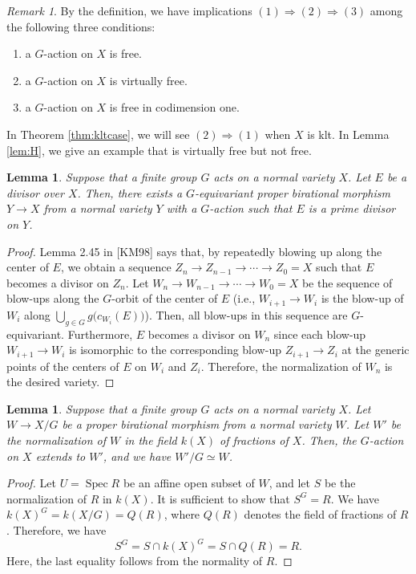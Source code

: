 \documentclass[a4paper,11pt]{amsart}
\newtheorem{lem}[thm]{Lemma}
\theoremstyle{definition}
\theoremstyle{remark}
\newtheorem{rmk}[thm]{Remark}
\begin{document}
\begin{rmk}\label{rmk:between}
By the definition, we have implications $(1) \Rightarrow (2) \Rightarrow (3)$ among the following three conditions:  
\begin{enumerate}
\item a $G$-action on $X$ is free. 
\item a $G$-action on $X$ is virtually free. 
\item a $G$-action on $X$ is free in codimension one.
\end{enumerate}
In Theorem \ref{thm:kltcase}, we will see $(2) \Rightarrow (1)$ when $X$ is klt. 
In Lemma \ref{lem:H}, we give an example that is virtually free but not free. 
\end{rmk}

\begin{lem}\label{lem:equiv_resol}
Suppose that a finite group $G$ acts on a normal variety $X$. 
Let $E$ be a divisor over $X$. 
Then, there exists a $G$-equivariant proper birational morphism $Y \to X$ from a normal variety $Y$ with a $G$-action such that $E$ is a prime divisor on $Y$. 
\end{lem}
\begin{proof}
Lemma 2.45 in [KM98] says that, by repeatedly blowing up along the center of $E$, we obtain a sequence
$Z_n \to Z_{n-1} \to \cdots \to Z_0=X$ such that $E$ becomes a divisor on $Z_n$. 
Let $W_n \to W_{n-1} \to \cdots \to W_0=X$ be the sequence of blow-ups along the $G$-orbit of the center of $E$ (i.e., $W_{i+1} \to W_i$ is the blow-up of $W_i$ along $\bigcup _{g \in G} g \big( c_{W_i}(E) \big)$). 
Then, all blow-ups in this sequence are $G$-equivariant. 
Furthermore, $E$ becomes a divisor on $W_n$ since each blow-up $W_{i+1} \to W_{i}$ is isomorphic to 
the corresponding blow-up $Z_{i+1} \to Z_i$ at the generic points of the centers of $E$ on $W_i$ and $Z_i$. 
Therefore, the normalization of $W_n$ is the desired variety. 
\end{proof}

\begin{lem}\label{lem:normalization}
Suppose that a finite group $G$ acts on a normal variety $X$. 
Let $W \to X/G$ be a proper birational morphism from a normal variety $W$. 
Let $W'$ be the normalization of $W$ in the field $k(X)$ of fractions of $X$. 
Then, the $G$-action on $X$ extends to $W'$, and we have $W' / G \simeq W$. 
\end{lem}
\begin{proof}
Let $U = \operatorname{Spec} R$ be an affine open subset of $W$, and let $S$ be the normalization of $R$ in $k(X)$. 
It is sufficient to show that $S ^G = R$. 
We have $k(X) ^G = k(X/G) = Q(R)$, where $Q(R)$ denotes the field of fractions of $R$. 
Therefore, we have 
\[
S ^G = S \cap k(X)^G = S \cap Q(R) = R. 
\]
Here, the last equality follows from the normality of $R$. 
\end{proof}
\end{document}
